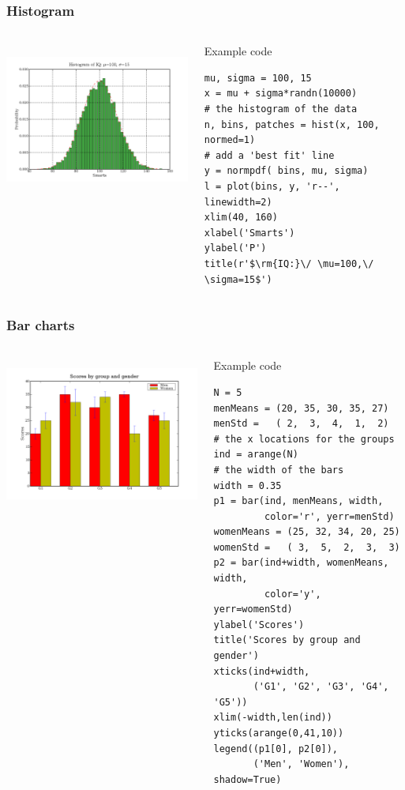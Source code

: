 \documentclass[14pt,compress]{beamer}
\begin{document}
\begin{frame}[fragile] \frametitle{Histogram}
  \begin{columns}
    \hspace*{-0.5in}
  \includegraphics[height=2in, interpolate=true]{data/histogram}  
    \begin{block}{Example code}
    \tiny
\begin{lstlisting}
mu, sigma = 100, 15
x = mu + sigma*randn(10000)
# the histogram of the data
n, bins, patches = hist(x, 100, normed=1)
# add a 'best fit' line
y = normpdf( bins, mu, sigma)
l = plot(bins, y, 'r--', linewidth=2)
xlim(40, 160)
xlabel('Smarts')
ylabel('P')
title(r'$\rm{IQ:}\/ \mu=100,\/ \sigma=15$')
\end{lstlisting}
  \end{block}
\end{columns}
\end{frame}

\begin{frame}[fragile] \frametitle{Bar charts}
  \begin{columns}
    \hspace*{-0.5in}
  \includegraphics[height=2in, interpolate=true]{data/barchart}  
    \begin{block}{Example code}
    \tiny
\begin{lstlisting}
N = 5
menMeans = (20, 35, 30, 35, 27)
menStd =   ( 2,  3,  4,  1,  2)
# the x locations for the groups
ind = arange(N) 
# the width of the bars
width = 0.35       
p1 = bar(ind, menMeans, width, 
         color='r', yerr=menStd)
womenMeans = (25, 32, 34, 20, 25)
womenStd =   ( 3,  5,  2,  3,  3)
p2 = bar(ind+width, womenMeans, width, 
         color='y', yerr=womenStd)
ylabel('Scores')
title('Scores by group and gender')
xticks(ind+width, 
       ('G1', 'G2', 'G3', 'G4', 'G5'))
xlim(-width,len(ind))
yticks(arange(0,41,10))
legend((p1[0], p2[0]), 
       ('Men', 'Women'), shadow=True)
\end{lstlisting}
  \end{block}
\end{columns}
\end{frame}
\end{document}
